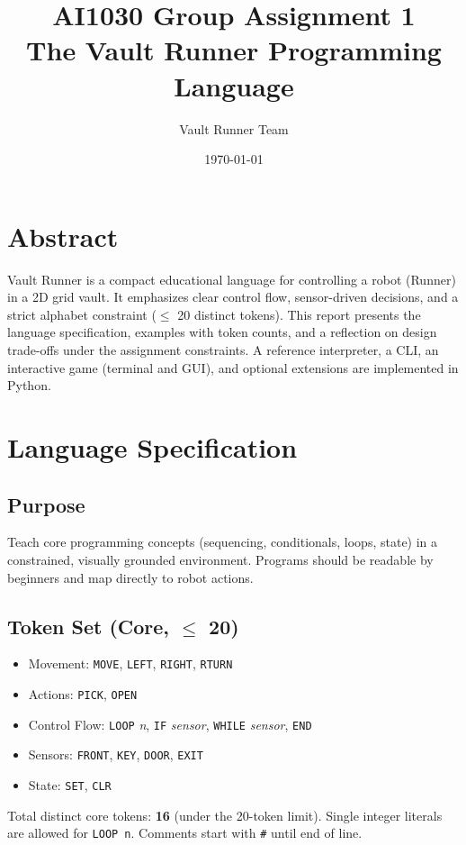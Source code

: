 \documentclass[11pt,a4paper]{article}
\title{AI1030 Group Assignment 1\\The Vault Runner Programming Language}
\author{Vault Runner Team}
\date{\today}
\begin{document}
\maketitle

\section*{Abstract}
Vault Runner is a compact educational language for controlling a robot (Runner) in a 2D grid vault. It emphasizes clear control flow, sensor-driven decisions, and a strict alphabet constraint (\(\leq\) 20 distinct tokens). This report presents the language specification, examples with token counts, and a reflection on design trade-offs under the assignment constraints. A reference interpreter, a CLI, an interactive game (terminal and GUI), and optional extensions are implemented in Python.

\section{Language Specification}
\subsection{Purpose}
Teach core programming concepts (sequencing, conditionals, loops, state) in a constrained, visually grounded environment. Programs should be readable by beginners and map directly to robot actions.

\subsection{Token Set (Core, \(\leq\) 20)}
\begin{itemize}[noitemsep]
  \item Movement: \texttt{MOVE}, \texttt{LEFT}, \texttt{RIGHT}, \texttt{RTURN}
  \item Actions: \texttt{PICK}, \texttt{OPEN}
  \item Control Flow: \texttt{LOOP} \textit{n}, \texttt{IF} \textit{sensor}, \texttt{WHILE} \textit{sensor}, \texttt{END}
  \item Sensors: \texttt{FRONT}, \texttt{KEY}, \texttt{DOOR}, \texttt{EXIT}
  \item State: \texttt{SET}, \texttt{CLR}
\end{itemize}
Total distinct core tokens: \textbf{16} (under the 20-token limit). Single integer literals are allowed for \texttt{LOOP n}. Comments start with \texttt{\#} until end of line.
\end{document}
